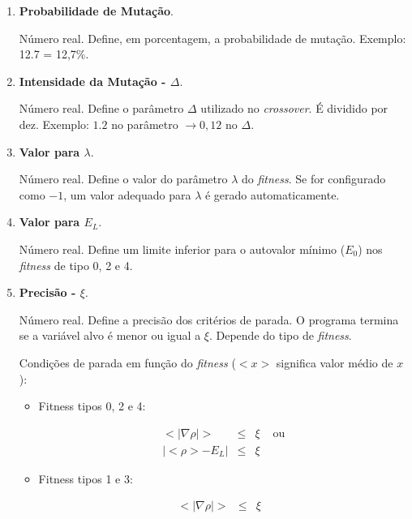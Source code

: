 \begin{enumerate}
		\item \textbf{Probabilidade de Mutação}.
		
		Número real. Define, em porcentagem, a probabilidade de mutação. Exemplo: 12.7 = 12,7\%.
		
		\item \textbf{Intensidade da Mutação - $\Delta$}.
		
			Número real. Define o parâmetro $\Delta$ utilizado no \emph{crossover}. É dividido por dez. Exemplo: $1.2$ no parâmetro $\rightarrow 0,12$ no $\Delta$.
		
		\item \textbf{Valor para $\lambda$}.
		
		Número real. Define o valor do parâmetro $\lambda$ do \emph{fitness}. Se for configurado como $-1$, um valor adequado para $\lambda$ é gerado automaticamente.
		
		\item \textbf{Valor para $E_L$}.
		
		Número real. Define um limite inferior para o autovalor mínimo ($E_0$) nos \emph{fitness} de tipo 0, 2 e 4. 
		
		\item \textbf{Precisão - $\xi$}.
		
		Número real. Define a precisão dos critérios de parada. O programa termina se a variável alvo é menor ou igual a $\xi$. Depende do tipo de \emph{fitness}.
		
		Condições de parada em função do \emph{fitness} ($<x>$ significa valor médio de $x$):
				
		\begin{itemize}
			\item Fitness tipos 0, 2 e 4:
						
			\begin{equation}\label{eq:criterioParada024}
				\begin{array}{ccll}
				<|\nabla \rho|> & \leq & \xi & \mbox{  ou} \\
				| <\rho> - E_L | & \leq & \xi &
				\end{array}
			\end{equation}
			
			
			\item Fitness tipos 1 e 3:
			
			\begin{equation}\label{eq:criterioParada13}
				\begin{array}{ccll}
					<|\nabla \rho|> & \leq & \xi &
				\end{array}
			\end{equation}
			

\end{itemize}
\end{enumerate}
